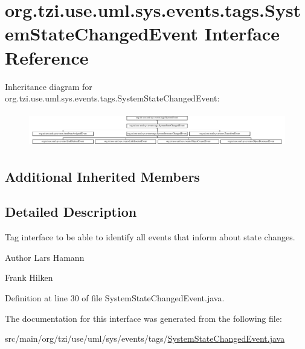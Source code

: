 \hypertarget{interfaceorg_1_1tzi_1_1use_1_1uml_1_1sys_1_1events_1_1tags_1_1_system_state_changed_event}{\section{org.\-tzi.\-use.\-uml.\-sys.\-events.\-tags.\-System\-State\-Changed\-Event Interface Reference}
\label{interfaceorg_1_1tzi_1_1use_1_1uml_1_1sys_1_1events_1_1tags_1_1_system_state_changed_event}
}
Inheritance diagram for org.\-tzi.\-use.\-uml.\-sys.\-events.\-tags.\-System\-State\-Changed\-Event\-:\begin{figure}[H]
\begin{center}
\leavevmode
\includegraphics[height=1.505376cm]{interfaceorg_1_1tzi_1_1use_1_1uml_1_1sys_1_1events_1_1tags_1_1_system_state_changed_event}
\end{center}
\end{figure}
\subsection*{Additional Inherited Members}


\subsection{Detailed Description}
Tag interface to be able to identify all events that inform about state changes. \begin{DoxyAuthor}{Author}
Lars Hamann 

Frank Hilken 
\end{DoxyAuthor}


Definition at line 30 of file System\-State\-Changed\-Event.\-java.



The documentation for this interface was generated from the following file\-:\begin{DoxyCompactItemize}
\item 
src/main/org/tzi/use/uml/sys/events/tags/\hyperlink{_system_state_changed_event_8java}{System\-State\-Changed\-Event.\-java}\end{DoxyCompactItemize}
